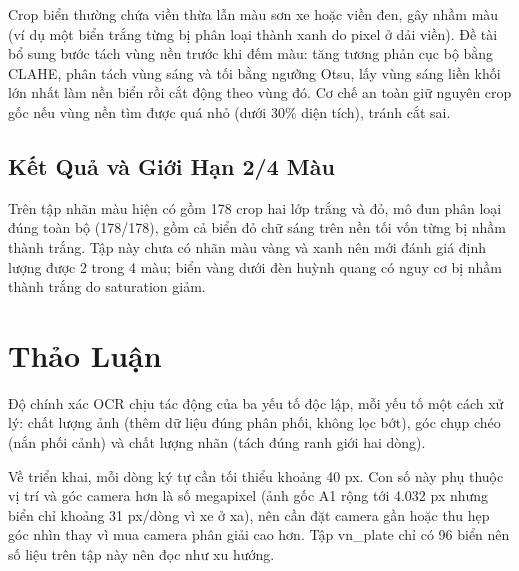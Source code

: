 Crop biển thường chứa viền thừa lẫn màu sơn xe hoặc viền đen, gây nhầm màu (ví dụ một biển
trắng từng bị phân loại thành xanh do pixel ở dải viền). Đề tài bổ sung bước tách vùng nền
trước khi đếm màu: tăng tương phản cục bộ bằng CLAHE, phân tách vùng sáng và tối bằng ngưỡng
Otsu, lấy vùng sáng liền khối lớn nhất làm nền biển rồi cắt động theo vùng đó. Cơ chế an toàn
giữ nguyên crop gốc nếu vùng nền tìm được quá nhỏ (dưới 30\% diện tích), tránh cắt sai.

\subsection{Kết Quả và Giới Hạn 2/4 Màu}

Trên tập nhãn màu hiện có gồm 178 crop hai lớp trắng và đỏ, mô đun phân loại đúng toàn bộ
(178/178), gồm cả biển đỏ chữ sáng trên nền tối vốn từng bị nhầm thành trắng. Tập này chưa có
nhãn màu vàng và xanh nên mới đánh giá định lượng được 2 trong 4 màu; biển vàng dưới đèn
huỳnh quang có nguy cơ bị nhầm thành trắng do saturation giảm.

\section{Thảo Luận}
\label{sec:ocr-thao-luan}

Độ chính xác OCR chịu tác động của ba yếu tố độc lập, mỗi yếu tố một cách xử lý: chất lượng
ảnh (thêm dữ liệu đúng phân phối, không lọc bớt), góc chụp chéo (nắn phối cảnh) và chất lượng
nhãn (tách đúng ranh giới hai dòng).

Về triển khai, mỗi dòng ký tự cần tối thiểu khoảng 40 px. Con số này phụ thuộc vị trí và góc
camera hơn là số megapixel (ảnh gốc A1 rộng tới 4.032 px nhưng biển chỉ khoảng 31 px/dòng vì
xe ở xa), nên cần đặt camera gần hoặc thu hẹp góc nhìn thay vì mua camera phân giải cao hơn.
Tập vn\_plate chỉ có 96 biển nên số liệu trên tập này nên đọc như xu hướng.
